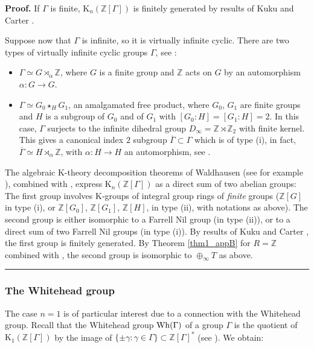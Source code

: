 \documentclass[reqno,11pt,letterpaper]{amsart}
\theoremstyle{plain}
\numberwithin{equation}{subsection}
\theoremstyle{remark}
\theoremstyle{plain}
\theoremstyle{definition}\newtheorem*{notation}{Notation}
\newcommand{\ov}{\overline}
\newenvironment{proof}[1][Proof]{\noindent\textbf{#1.} }{\ \rule{0.5em}{0.5em}}
\newcommand{\RK}{\mathrm{K}}
\newcommand{\BZ}{\mathbb{Z}}
\begin{document}
\begin{proof} If $\Gamma$ is  finite, $\RK_n(\BZ[\Gamma])$ is finitely generated   by results of Kuku \cite{Kuku2} and Carter \cite{Carter}. 

Suppose now that $\Gamma$ is infinite, so it
is virtually infinite cyclic. There are two types of virtually infinite cyclic groups $\Gamma$, see \cite[Lemma 3.31]{DKR}:
\begin{itemize}
\item[i)]   $\Gamma\simeq G\rtimes_\alpha \BZ$, where $G$ is a finite group and $\BZ$ acts on $G$ by an automorphism $\alpha: G\to G$. 

\item[ii)] $\Gamma\simeq G_0\star_H G_1$, an amalgamated free product, where $G_0$, $G_1$ are finite groups and $H$ is a subgroup of $G_0$ and of $G_1$ with $[G_0:H]=[G_1:H]=2$.
In this case, $\Gamma$ surjects  to the infinite dihedral group $D_\infty=\BZ\rtimes\BZ_2 $ with finite kernel. This gives a canonical index $2$ subgroup $\ov\Gamma\subset \Gamma$
which is of type (i), in fact, $\ov\Gamma\simeq H\rtimes_\alpha \BZ$, with $\alpha: H\to H$ an automorphism, see \cite{DKR}.
\end{itemize}


The algebraic $\RK$-theory decomposition theorems of Waldhausen (see for example \cite[(1), (2), p. 2392]{DKR}), combined with \cite[Thm 0.1]{DKR},
express $\RK_n(\BZ[\Gamma])$ as a direct sum of two abelian groups: The first  group involves $\RK$-groups of integral group rings of \emph{finite} groups ($\BZ[G]$ in type (i), or $\BZ[G_0]$, $\BZ[G_1]$, $\BZ[H]$, in type (ii), with   notations as above). The second group is either isomorphic to a Farrell Nil group (in type (ii)), or to a direct sum of two Farrell Nil groups (in type (i)). By results of Kuku \cite{Kuku2} and Carter \cite{Carter}, the first group is  finitely generated. By Theorem \ref{thm1_appB} for $R=\BZ$ combined with
\cite[Theorem C]{LPW}, the second group is isomorphic  to $\oplus_\infty T$ as above.
\end{proof}

 \subsubsection{The  Whitehead group} The case $n=1$  is of particular interest due to a connection with the Whitehead group. Recall that the Whitehead group ${\rm Wh}(\Gamma)$ of a group $\Gamma$ is the quotient of $\RK_1(\mathbb{Z}[\Gamma])$ by the image of $\{\pm \gamma: \gamma \in \Gamma\} \subset \mathbb{Z}[\Gamma]^*$ (see \cite[2.4.1]{Rosenberg}).  
We obtain:  
\end{document}
